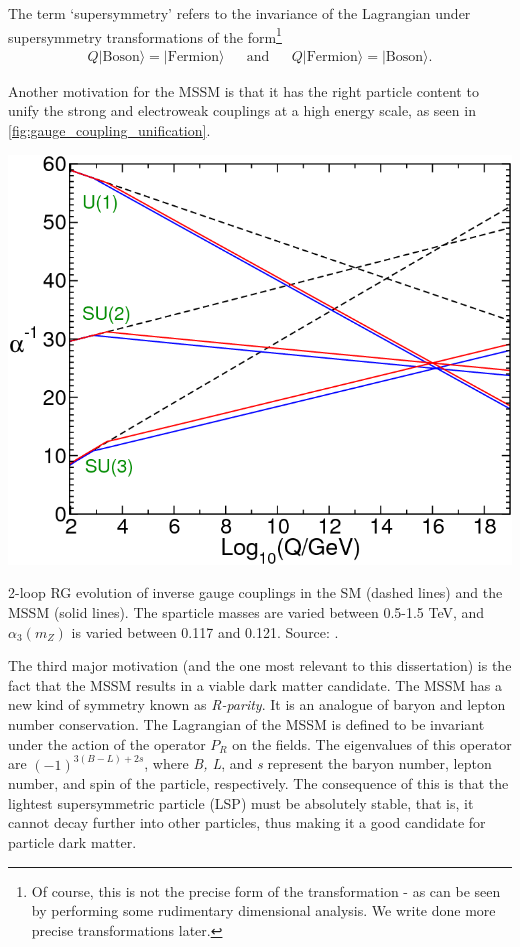 The term `supersymmetry' refers to the invariance of the Lagrangian under supersymmetry transformations of the form\footnote{Of course, this is not the precise form of the transformation - as can be seen by performing some rudimentary dimensional analysis. We write done more precise transformations later.}
\begin{align*}
  Q|\text{Boson}\rangle = |\text{Fermion}\rangle &&\text{and}&& Q|\text{Fermion}\rangle = |\text{Boson}\rangle.
\end{align*}

Another motivation for the MSSM is that it has the right particle content to unify the strong and electroweak couplings at a high energy scale, as seen in \autoref{fig:gauge_coupling_unification}.

\begin{marginfigure}[-4cm]
    \includegraphics[width=\textwidth]{images/gauge_coupling_unification}
  \caption{2-loop RG evolution of inverse gauge couplings in the SM (dashed lines) and the MSSM (solid lines). The sparticle masses are varied between 0.5-1.5 TeV, and $\alpha_3(m_Z)$ is varied between 0.117 and 0.121. Source: \citep{Martin1997}.}
  \label{fig:gauge_coupling_unification}
\end{marginfigure}

The third major motivation (and the one most relevant to this dissertation) is the fact that the MSSM results in a viable dark matter candidate. The MSSM has a new kind of symmetry known as \emph{R-parity}. It is an analogue of baryon and lepton number conservation. The Lagrangian of the MSSM is defined to be invariant under the action of the operator $P_R$ on the fields. The eigenvalues of this operator are $(-1)^{3(B-L)+2s}$, where \emph{B, L}, and \emph{s} represent the baryon number, lepton number, and spin of the particle, respectively. The consequence of this is that the lightest supersymmetric particle (LSP) must be absolutely stable, that is, it cannot decay further into other particles, thus making it a good candidate for particle dark matter.

